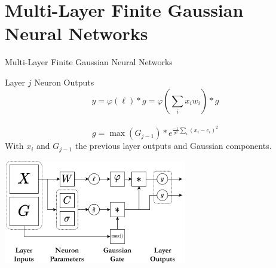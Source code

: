 \documentclass{beamer}
\begin{document}
\section{Multi-Layer Finite Gaussian Neural Networks}

\begin{frame}{Multi-Layer Finite Gaussian Neural Networks}
   \begin{block}{Layer $j$ Neuron Outputs}
        $$ y =  \varphi(\ell)*g = \varphi(\sum_i x_{i} w_{i}) * g $$\\[-0.2em]
        $$ g = \max(G_{j-1}) * e^{\frac{-1}{\sigma^2}\sum_{i}(x_i-c_i)^2}$$
        With $x_{i}$ and $G_{j-1}$ the previous layer outputs and Gaussian components.
    \end{block}
    
     \begin{center}
        \includegraphics[width=0.6\textwidth]{images/multi-layer-fgn/FGN-Network.png}
    \end{center}

\end{frame}
\end{document}
